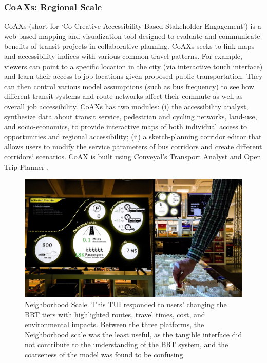 {{        \subsubsection{CoAXs: Regional Scale}
        {
            CoAXs (short for `Co-Creative Accessibility-Based Stakeholder Engagement') is a web-based mapping and visualization tool designed to evaluate and communicate benefits of transit projects in collaborative planning. CoAXs seeks to link maps and accessibility indices with various common travel patterns. For example, viewers can point to a specific location in the city (via interactive touch interface) and learn their access to job locations given proposed public transportation. They can then control various model assumptions (such as bus frequency) to see how different transit systems and route networks affect their commute as well as overall job accessibility.
            \newline
            CoAXs has two modules: (i) the accessibility analyst, synthesize data about transit service, pedestrian and cycling networks, land-use, and socio-economics, to provide interactive maps of both individual access to opportunities and regional accessibility; (ii) a sketch-planning corridor editor that allows users to modify the service parameters of bus corridors and create different corridors` scenarios.
            CoAX is built using Conveyal's Transport Analyst and Open Trip Planner \cite{Conveyal33:online}.
        }


        \begin{figure}[!htb]
            \begin{center}
                \includegraphics[width=.8\textwidth]{chapters/consensus/BRT/figures/brt11.jpeg}
            \end{center}
            \caption{Neighborhood Scale. This TUI responded to users' changing the BRT tiers with highlighted routes, travel times, cost, and environmental impacts. Between the three platforms, the Neighborhood scale was the least useful, as the tangible interface did not contribute to the understanding of the BRT system, and the coarseness of the model was found to be confusing.}
            \label{fig:brt_neighborhood_scale}
        \end{figure}


}}
